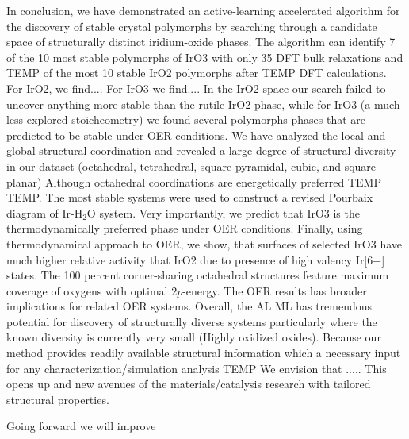 

%

In conclusion, we have demonstrated an active-learning accelerated algorithm for the discovery of stable crystal polymorphs by searching through a candidate space of structurally distinct iridium-oxide phases.
The algorithm can identify 7 of the 10 most stable polymorphs of IrO3 with only 35 DFT bulk relaxations and TEMP of the most 10 stable IrO2 polymorphs after TEMP DFT calculations.
% 
For IrO2, we find....  For IrO3 we find.... 
In the IrO2 space our search failed to uncover anything more stable than the rutile-IrO2 phase,
while for IrO3 (a much less explored stoicheometry) we found several polymorphs phases that are predicted to be stable under OER conditions.
We have analyzed the local and global structural coordination and revealed a large degree of structural diversity in our dataset (octahedral, tetrahedral, square-pyramidal, cubic, and square-planar)
Although octahedral coordinations are energetically preferred TEMP TEMP.
%
The most stable systems were used to construct a revised Pourbaix diagram of Ir-H$_2$O system.
%
Very importantly, we predict that IrO3 is the thermodynamically preferred phase under OER conditions.
%
Finally, using thermodynamical approach to OER, we show, 
that surfaces of selected IrO3 have much higher relative activity that IrO2 due to presence of high valency Ir[6+] states.
%
The 100 percent corner-sharing octahedral structures feature maximum coverage of oxygens with optimal $2p$-energy.
%
The OER results has broader implications for related OER systems.
%
Overall, the AL ML has tremendous potential for discovery of structurally diverse systems particularly where the known diversity is currently very small (Highly oxidized oxides).
%
Because our method provides readily available structural information which a necessary input for any characterization/simulation analysis TEMP We envision that ..... 
%
This opens up and new avenues of the materials/catalysis research with tailored structural properties. 


Going forward we will improve


